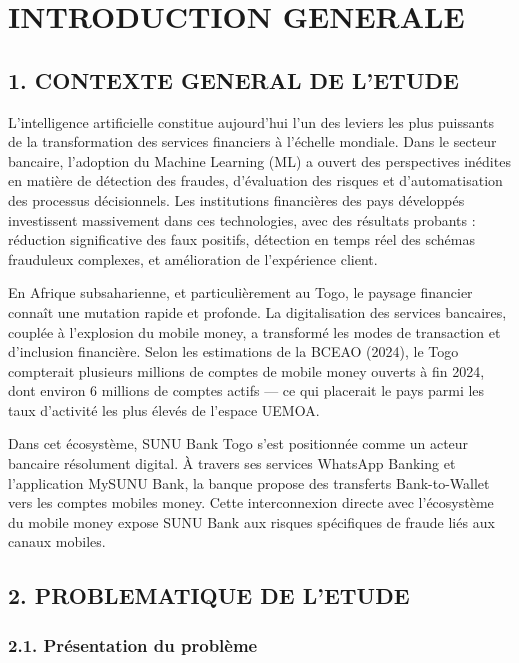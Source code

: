 \documentclass[
  12pt,
]{article}
\begin{document}
\section{INTRODUCTION GENERALE}\label{introduction-generale}

\subsection{1. CONTEXTE GENERAL DE
L’ETUDE}\label{contexte-general-de-letude}

L’intelligence artificielle constitue aujourd’hui l’un des leviers les
plus puissants de la transformation des services financiers à l’échelle
mondiale. Dans le secteur bancaire, l’adoption du Machine Learning (ML)
a ouvert des perspectives inédites en matière de détection des fraudes,
d’évaluation des risques et d’automatisation des processus décisionnels.
Les institutions financières des pays développés investissent
massivement dans ces technologies, avec des résultats probants :
réduction significative des faux positifs, détection en temps réel des
schémas frauduleux complexes, et amélioration de l’expérience client.

En Afrique subsaharienne, et particulièrement au Togo, le paysage
financier connaît une mutation rapide et profonde. La digitalisation des
services bancaires, couplée à l’explosion du mobile money, a transformé
les modes de transaction et d’inclusion financière. Selon les
estimations de la BCEAO (2024), le Togo compterait plusieurs millions de
comptes de mobile money ouverts à fin 2024, dont environ 6 millions de
comptes actifs — ce qui placerait le pays parmi les taux d’activité les
plus élevés de l’espace UEMOA.

Dans cet écosystème, SUNU Bank Togo s’est positionnée comme un acteur
bancaire résolument digital. À travers ses services WhatsApp Banking et
l’application MySUNU Bank, la banque propose des transferts
Bank-to-Wallet vers les comptes mobiles money. Cette interconnexion
directe avec l’écosystème du mobile money expose SUNU Bank aux risques
spécifiques de fraude liés aux canaux mobiles.

\subsection{2. PROBLEMATIQUE DE L’ETUDE}\label{problematique-de-letude}

\subsubsection{2.1. Présentation du
problème}\label{pruxe9sentation-du-probluxe8me}
\end{document}
